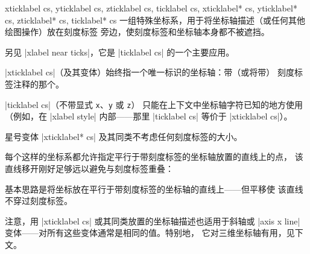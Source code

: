 \begin{coordinatesystemlist}{%
    xticklabel cs,
    yticklabel cs,
    zticklabel cs,
    ticklabel cs,
    xticklabel* cs,
    yticklabel* cs,
    zticklabel* cs,
    ticklabel* cs%
}
    一组特殊坐标系，用于将坐标轴描述（或任何其他绘图操作）放在刻度标签
    旁边，使刻度标签和坐标轴本身都不被遮挡。

    另见 |xlabel near ticks|，它是 |ticklabel cs| 的一个主要应用。

    |xticklabel cs|（及其变体）始终指一个唯一标识的坐标轴：带（或将带）
    刻度标签注释的那个。

    |ticklabel cs|（不带显式 \texttt{x}、\texttt{y} 或 \texttt{z}）
    只能在上下文中坐标轴字符已知的地方使用（例如，在 |xlabel style|
    内部——那里 |ticklabel cs| 等价于 |xticklabel cs|）。

    星号变体 |xticklabel* cs| 及其同类不考虑任何刻度标签的大小。

    每个这样的坐标系都允许指定平行于带刻度标签的坐标轴放置的直线上的点，
    该直线移开刚好足够远以避免与刻度标签重叠：
\begin{codeexample}[width=4cm]
\end{codeexample}

    基本思路是将坐标放在平行于带刻度标签的坐标轴的直线上——但平移使
    该直线不穿过刻度标签。

    注意，用 |xticklabel cs| 或其同类放置的坐标轴描述也适用于斜轴或
    |axis x line| 变体——对所有这些变体通常是相同的值。特别地，
    它对三维坐标轴有用，见下文。


\end{coordinatesystemlist}
